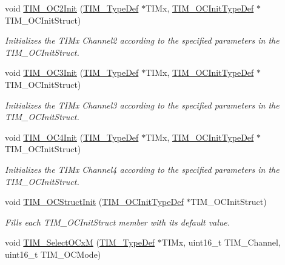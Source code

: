 \begin{DoxyCompactItemize}
void \hyperlink{group___t_i_m_ga2017455121d910d6ff63ac6f219842c5}{T\+I\+M\+\_\+\+O\+C2\+Init} (\hyperlink{struct_t_i_m___type_def}{T\+I\+M\+\_\+\+Type\+Def} $\ast$T\+I\+Mx, \hyperlink{struct_t_i_m___o_c_init_type_def}{T\+I\+M\+\_\+\+O\+C\+Init\+Type\+Def} $\ast$T\+I\+M\+\_\+\+O\+C\+Init\+Struct)
\begin{DoxyCompactList}\small\item\em Initializes the T\+I\+Mx Channel2 according to the specified parameters in the T\+I\+M\+\_\+\+O\+C\+Init\+Struct. \end{DoxyCompactList}\item 
void \hyperlink{group___t_i_m_ga90d4a358d4e6d4c5ed17dc1d6beb5f30}{T\+I\+M\+\_\+\+O\+C3\+Init} (\hyperlink{struct_t_i_m___type_def}{T\+I\+M\+\_\+\+Type\+Def} $\ast$T\+I\+Mx, \hyperlink{struct_t_i_m___o_c_init_type_def}{T\+I\+M\+\_\+\+O\+C\+Init\+Type\+Def} $\ast$T\+I\+M\+\_\+\+O\+C\+Init\+Struct)
\begin{DoxyCompactList}\small\item\em Initializes the T\+I\+Mx Channel3 according to the specified parameters in the T\+I\+M\+\_\+\+O\+C\+Init\+Struct. \end{DoxyCompactList}\item 
void \hyperlink{group___t_i_m_ga64571ebbb58cac39a9e760050175f11c}{T\+I\+M\+\_\+\+O\+C4\+Init} (\hyperlink{struct_t_i_m___type_def}{T\+I\+M\+\_\+\+Type\+Def} $\ast$T\+I\+Mx, \hyperlink{struct_t_i_m___o_c_init_type_def}{T\+I\+M\+\_\+\+O\+C\+Init\+Type\+Def} $\ast$T\+I\+M\+\_\+\+O\+C\+Init\+Struct)
\begin{DoxyCompactList}\small\item\em Initializes the T\+I\+Mx Channel4 according to the specified parameters in the T\+I\+M\+\_\+\+O\+C\+Init\+Struct. \end{DoxyCompactList}\item 
void \hyperlink{group___t_i_m_ga394683c78ae02837882e36014e11643e}{T\+I\+M\+\_\+\+O\+C\+Struct\+Init} (\hyperlink{struct_t_i_m___o_c_init_type_def}{T\+I\+M\+\_\+\+O\+C\+Init\+Type\+Def} $\ast$T\+I\+M\+\_\+\+O\+C\+Init\+Struct)
\begin{DoxyCompactList}\small\item\em Fills each T\+I\+M\+\_\+\+O\+C\+Init\+Struct member with its default value. \end{DoxyCompactList}\item 
void \hyperlink{group___t_i_m_ga83ea0af5a7c1af521236ce5e4d2c42b0}{T\+I\+M\+\_\+\+Select\+O\+CxM} (\hyperlink{struct_t_i_m___type_def}{T\+I\+M\+\_\+\+Type\+Def} $\ast$T\+I\+Mx, uint16\+\_\+t T\+I\+M\+\_\+\+Channel, uint16\+\_\+t T\+I\+M\+\_\+\+O\+C\+Mode)

\end{DoxyCompactItemize}
